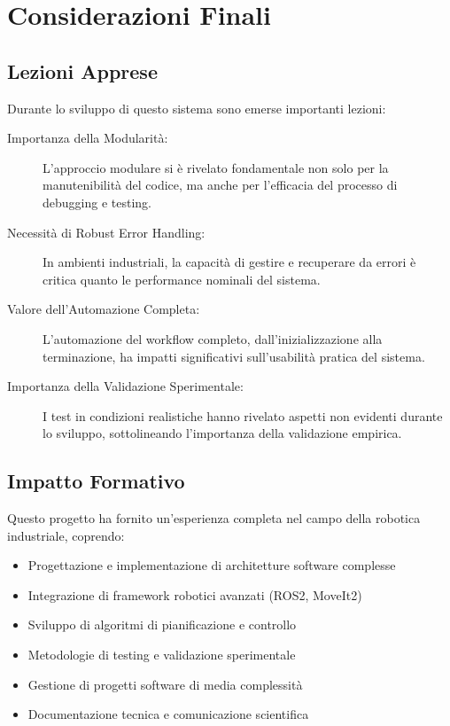 \documentclass[12pt,a4paper,twoside,openright]{book}
\begin{document}
\section{Considerazioni Finali}

\subsection{Lezioni Apprese}

Durante lo sviluppo di questo sistema sono emerse importanti lezioni:

\begin{description}
    \item[Importanza della Modularità:] L'approccio modulare si è rivelato fondamentale non solo per la manutenibilità del codice, ma anche per l'efficacia del processo di debugging e testing.
    
    \item[Necessità di Robust Error Handling:] In ambienti industriali, la capacità di gestire e recuperare da errori è critica quanto le performance nominali del sistema.
    
    \item[Valore dell'Automazione Completa:] L'automazione del workflow completo, dall'inizializzazione alla terminazione, ha impatti significativi sull'usabilità pratica del sistema.
    
    \item[Importanza della Validazione Sperimentale:] I test in condizioni realistiche hanno rivelato aspetti non evidenti durante lo sviluppo, sottolineando l'importanza della validazione empirica.
\end{description}

\subsection{Impatto Formativo}

Questo progetto ha fornito un'esperienza completa nel campo della robotica industriale, coprendo:

\begin{itemize}
    \item Progettazione e implementazione di architetture software complesse
    \item Integrazione di framework robotici avanzati (ROS2, MoveIt2)
    \item Sviluppo di algoritmi di pianificazione e controllo
    \item Metodologie di testing e validazione sperimentale
    \item Gestione di progetti software di media complessità
    \item Documentazione tecnica e comunicazione scientifica
\end{itemize}
\end{document}
